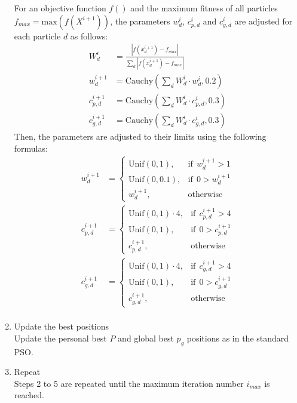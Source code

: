 \documentclass[
  oneside]{book}
\begin{document}
\begin{enumerate}
  For an objective function \(f()\) and the maximum fitness of all particles \(f_{max} = \text{max}(f(X^{i+1}))\), the parameters \(w_d^{i}\), \(c_{p,d}^{i}\) and \(c_{g,d}^{i}\) are adjusted for each particle \(d\) as follows:
  \begin{align*}
    W^i_d &= \frac{\left| f(x_d^{i+1})-f_{max} \right|}{\sum_d\left| f(x_d^{i+1})-f_{max} \right|} \\
    w_d^{i+1} &= \text{Cauchy}(\sum_d W^i_d \cdot w_d^{i}, 0.2) \\
    c_{p,d}^{i+1} &= \text{Cauchy}(\sum_d W^i_d \cdot c_{p,d}^{i}, 0.3) \\
    c_{g,d}^{i+1} &= \text{Cauchy}(\sum_d W^i_d \cdot c_{g,d}^{i}, 0.3)
  \end{align*}
  Then, the parameters are adjusted to their limits using the following formulas:
  \begin{align*}
  w_d^{i+1} &= 
    \begin{cases}
   \text{Unif}(0,1), & \text{if}\ \ w_d^{i+1} > 1\\
   \text{Unif}(0,0.1), & \text{if}\ \  0 > w_d^{i+1}\\
   w_d^{i+1}, & \text{otherwise}
    \end{cases}\\
  c_{p,d}^{i+1} &= 
    \begin{cases}
   \text{Unif}(0,1) \cdot 4, & \text{if}\ \ c_{p,d}^{i+1} > 4\\
   \text{Unif}(0,1), & \text{if}\ \  0 > c_{p,d}^{i+1}\\
   c_{p,d}^{i+1}, & \text{otherwise}
    \end{cases}\\
  c_{g,d}^{i+1} &= 
    \begin{cases}
   \text{Unif}(0,1) \cdot 4, & \text{if}\ \ c_{g,d}^{i+1} > 4\\
   \text{Unif}(0,1), & \text{if}\ \  0 > c_{g,d}^{i+1}\\
   c_{g,d}^{i+1}, & \text{otherwise}
    \end{cases}\\
  \end{align*}
\item
  Update the best positions\\
  Update the personal best \(P\) and global best \(p_g\) positions as in the standard PSO.
\item
  Repeat\\
  Steps 2 to 5 are repeated until the maximum iteration number \(i_{max}\) is reached.
\end{enumerate}
\end{document}
